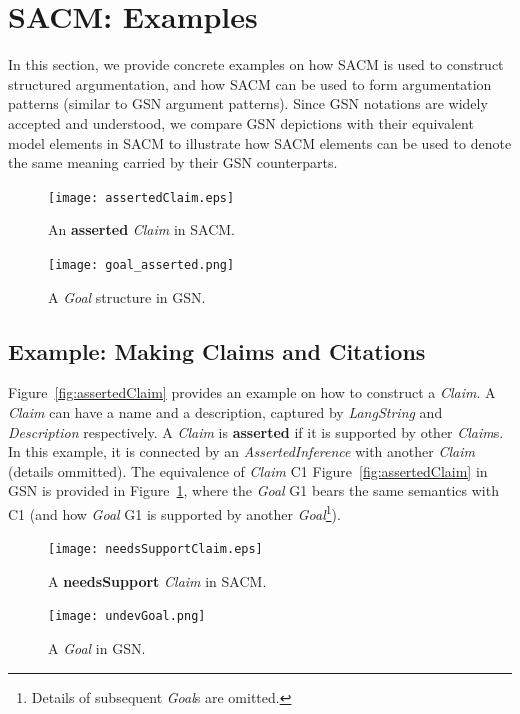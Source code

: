 \section{SACM: Examples}
In this section, we provide concrete examples on how SACM is used to construct structured argumentation, and how SACM can be used to form argumentation patterns (similar to GSN argument patterns). 
Since GSN notations are widely accepted and understood, we compare GSN depictions with their equivalent model elements in SACM to illustrate how SACM elements can be used to denote the same meaning carried by their GSN counterparts.

\begin{figure}
	\centering
	\begin{minipage}[b]{0.7\textwidth}
		\texttt{[image: assertedClaim.eps]}
		\caption{An \textbf{asserted} \textit{Claim} in SACM.}
		\label{fig:assertedClaim}
	\end{minipage}
	\hfill
	\begin{minipage}[b]{0.28\textwidth}
		\texttt{[image: goal\_asserted.png]}
		\caption{A \textit{Goal} structure in GSN.}
		\label{fig:goalingsn}
	\end{minipage}
\end{figure}

\subsection{Example: Making Claims and Citations}
\label{sec:claims}

Figure~\ref{fig:assertedClaim} provides an example on how to construct a \textit{Claim}. 
A \textit{Claim} can have a name and a description, captured by \textit{LangString} and \textit{Description} respectively. 
A \textit{Claim} is \textbf{asserted} if it is supported by other \textit{Claim}s. 
In this example, it is connected by an \textit{AssertedInference} with another \textit{Claim} (details ommitted). 
The equivalence of \textit{Claim} C1 Figure~\ref{fig:assertedClaim} in GSN is provided in Figure~\ref{fig:goalingsn}, where the \textit{Goal} G1 bears the same semantics with C1 (and how \textit{Goal} G1 is supported by another \textit{Goal}\footnote{Details of subsequent \textit{Goal}s are omitted.}).

\begin{figure}
	\centering
	\begin{minipage}[b]{0.7\textwidth}
		\texttt{[image: needsSupportClaim.eps]}
		\caption{A \textbf{needsSupport} \textit{Claim} in SACM.}
		\label{fig:needsSupportClaim}
	\end{minipage}
	\hfill
	\begin{minipage}[b]{0.28\textwidth}
		\texttt{[image: undevGoal.png]}
		\caption{A \textit{Goal} in GSN.}
		\label{fig:undevGoal}
	\end{minipage}
\end{figure}

